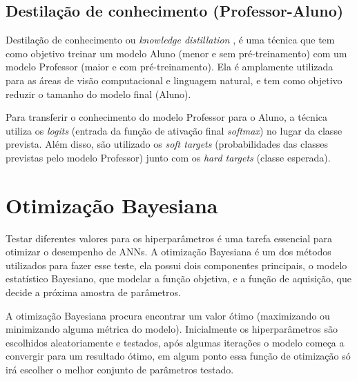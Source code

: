 \subsection{Destilação de conhecimento (Professor-Aluno)}\label{conceitos_destilacao}

Destilação de conhecimento ou \textit{knowledge distillation} \cite{hinton2015distilling}, é uma técnica que tem
como objetivo treinar um modelo Aluno (menor e sem pré-treinamento) com um modelo Professor
(maior e com pré-treinamento). Ela é amplamente utilizada para as áreas de visão computacional e linguagem natural,
e tem como objetivo reduzir o tamanho do modelo final (Aluno).

Para transferir o conhecimento do modelo Professor para o Aluno, a técnica utiliza os \textit{logits} (entrada da
função de ativação final \textit{softmax}) no lugar da classe prevista. Além disso, são utilizado os
\textit{soft targets} (probabilidades das classes previstas pelo modelo Professor) junto com os
\textit{hard targets} (classe esperada).


\section{Otimização Bayesiana}\label{cap_conceitos_bayesiana}
Testar diferentes valores para os hiperparâmetros é uma tarefa essencial para otimizar o desempenho de ANNs.
A otimização Bayesiana é um dos métodos utilizados para fazer esse teste, ela possui dois componentes principais,
o modelo estatístico Bayesiano, que modelar a função objetiva, e a função de aquisição, que decide a próxima amostra
de parâmetros. \cite{frazier2018tutorial}

A otimização Bayesiana procura encontrar um valor ótimo (maximizando ou minimizando alguma métrica do modelo).
Inicialmente os hiperparâmetros são escolhidos aleatoriamente e testados, após algumas iterações o modelo começa
a convergir para um resultado ótimo, em algum ponto essa função de otimização só irá escolher o melhor conjunto de
parâmetros testado.

